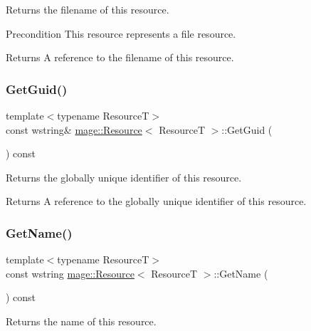 Returns the filename of this resource.

\begin{DoxyPrecond}{Precondition}
This resource represents a file resource. 
\end{DoxyPrecond}
\begin{DoxyReturn}{Returns}
A reference to the filename of this resource. 
\end{DoxyReturn}
\hypertarget{classmage_1_1_resource_adaa2464cb1fdb51a3f6028c0f316d083}{}\label{classmage_1_1_resource_adaa2464cb1fdb51a3f6028c0f316d083} 
\subsubsection{\texorpdfstring{Get\+Guid()}{GetGuid()}}
{\footnotesize\ttfamily template$<$typename ResourceT$>$ \\
const wstring\& \hyperlink{classmage_1_1_resource}{mage\+::\+Resource}$<$ ResourceT $>$\+::Get\+Guid (\begin{DoxyParamCaption}{ }\end{DoxyParamCaption}) const\hspace{0.3cm}{\ttfamily [noexcept]}}

Returns the globally unique identifier of this resource.

\begin{DoxyReturn}{Returns}
A reference to the globally unique identifier of this resource. 
\end{DoxyReturn}
\hypertarget{classmage_1_1_resource_a6414c6f8342f4cc92e7ed7861000cd2f}{}\label{classmage_1_1_resource_a6414c6f8342f4cc92e7ed7861000cd2f} 
\subsubsection{\texorpdfstring{Get\+Name()}{GetName()}}
{\footnotesize\ttfamily template$<$typename ResourceT$>$ \\
const wstring \hyperlink{classmage_1_1_resource}{mage\+::\+Resource}$<$ ResourceT $>$\+::Get\+Name (\begin{DoxyParamCaption}{ }\end{DoxyParamCaption}) const}

Returns the name of this resource.

